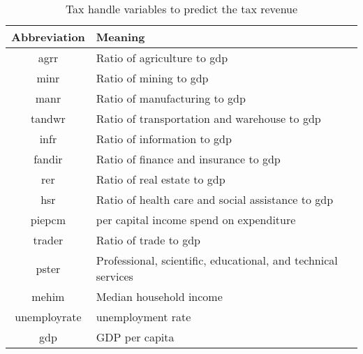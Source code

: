\begin{table}[htbp]
    \centering
    \caption{Tax handle variables to predict the tax revenue}
    \begin{tabular}{cl}
        \toprule
        Abbreviation & Meaning                                                       \\
        \midrule
        agrr         & Ratio of agriculture to gdp                                   \\
        minr         & Ratio of mining to gdp                                        \\
        manr         & Ratio of manufacturing to gdp                                 \\
        tandwr       & Ratio of transportation and warehouse to gdp                  \\
        infr         & Ratio of information to gdp                                   \\
        fandir       & Ratio of finance and insurance to gdp                         \\
        rer          & Ratio of real estate to gdp                                   \\
        hsr          & Ratio of health care and social assistance to gdp             \\
        piepcm       & per capital income spend on expenditure                       \\
        trader       & Ratio of trade to gdp                                         \\
        pster        & Professional, scientific, educational, and technical services \\
        mehim        & Median household income                                       \\
        unemployrate & unemployment rate                                             \\
        gdp          & GDP per capita                                                \\
        \bottomrule
    \end{tabular}%
    \label{handlevariables}%
\end{table}%

\clearpage

